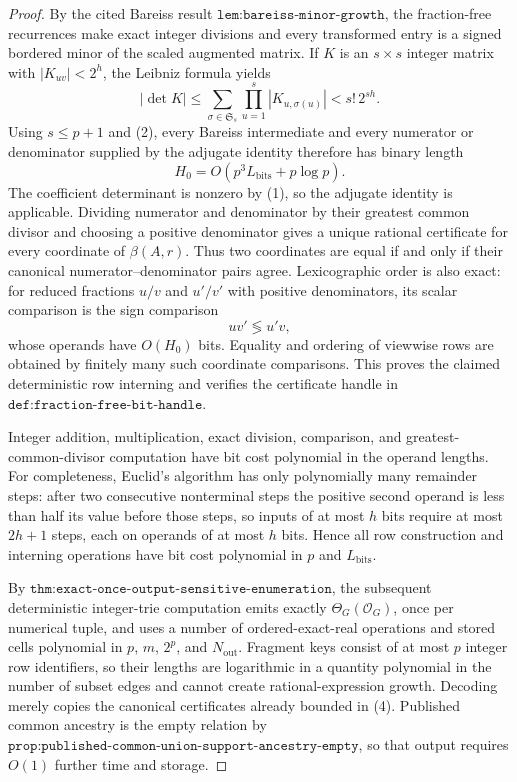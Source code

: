 \documentclass{article}
\begin{document}
\begin{proof}
By the cited Bareiss result \(\texttt{lem:bareiss-minor-growth}\), the fraction-free recurrences make exact integer divisions and every transformed entry is a signed bordered minor of the scaled augmented matrix.  If \(K\) is an \(s\times s\) integer matrix with \(|K_{uv}|<2^h\), the Leibniz formula yields
\[
 |\det K|
 \leq \sum_{\sigma\in\mathfrak S_s}
       \prod_{u=1}^s |K_{u,\sigma(u)}|
 < s!\,2^{sh}.
\tag{3}
\]
Using \(s\leq p+1\) and (2), every Bareiss intermediate and every numerator or denominator supplied by the adjugate identity therefore has binary length
\[
 H_0=O(p^3L_{\mathrm{bits}}+p\log p).
\tag{4}
\]
The coefficient determinant is nonzero by (1), so the adjugate identity is applicable.  Dividing numerator and denominator by their greatest common divisor and choosing a positive denominator gives a unique rational certificate for every coordinate of \(\beta(A,r)\).  Thus two coordinates are equal if and only if their canonical numerator--denominator pairs agree.  Lexicographic order is also exact: for reduced fractions \(u/v\) and \(u'/v'\) with positive denominators, its scalar comparison is the sign comparison
\[
 uv'\mathrel{\lessgtr}u'v,
\]
whose operands have \(O(H_0)\) bits.  Equality and ordering of viewwise rows are obtained by finitely many such coordinate comparisons.  This proves the claimed deterministic row interning and verifies the certificate handle in \(\texttt{def:fraction-free-bit-handle}\).

Integer addition, multiplication, exact division, comparison, and greatest-common-divisor computation have bit cost polynomial in the operand lengths.  For completeness, Euclid's algorithm has only polynomially many remainder steps: after two consecutive nonterminal steps the positive second operand is less than half its value before those steps, so inputs of at most \(h\) bits require at most \(2h+1\) steps, each on operands of at most \(h\) bits.  Hence all row construction and interning operations have bit cost polynomial in \(p\) and \(L_{\mathrm{bits}}\).

By \(\texttt{thm:exact-once-output-sensitive-enumeration}\), the subsequent deterministic integer-trie computation emits exactly \(\Theta_G(\mathcal O_G)\), once per numerical tuple, and uses a number of ordered-exact-real operations and stored cells polynomial in \(p\), \(m\), \(2^p\), and \(N_{\mathrm{out}}\).  Fragment keys consist of at most \(p\) integer row identifiers, so their lengths are logarithmic in a quantity polynomial in the number of subset edges and cannot create rational-expression growth.  Decoding merely copies the canonical certificates already bounded in (4).  Published common ancestry is the empty relation by \(\texttt{prop:published-common-union-support-ancestry-empty}\), so that output requires \(O(1)\) further time and storage.


\end{proof}
\end{document}
